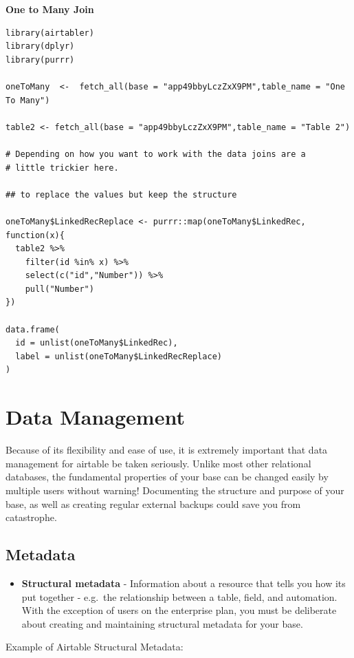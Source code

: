 \documentclass[
]{book}
\providecommand{\tightlist}{%
  \setlength{\itemsep}{0pt}\setlength{\parskip}{0pt}}
\begin{document}
\textbf{One to Many Join}

\begin{verbatim}
library(airtabler)
library(dplyr)
library(purrr)

oneToMany  <-  fetch_all(base = "app49bbyLczZxX9PM",table_name = "One To Many")

table2 <- fetch_all(base = "app49bbyLczZxX9PM",table_name = "Table 2")

# Depending on how you want to work with the data joins are a 
# little trickier here. 

## to replace the values but keep the structure

oneToMany$LinkedRecReplace <- purrr::map(oneToMany$LinkedRec, function(x){
  table2 %>%
    filter(id %in% x) %>%
    select(c("id","Number")) %>% 
    pull("Number")
})

data.frame(
  id = unlist(oneToMany$LinkedRec), 
  label = unlist(oneToMany$LinkedRecReplace)
)
\end{verbatim}

\hypertarget{data-management}{%
\section{Data Management}\label{data-management}}

Because of its flexibility and ease of use, it is extremely important that data
management for airtable be taken seriously. Unlike most other relational databases,
the fundamental properties of your base can be changed easily by multiple users
without warning! Documenting the structure and purpose of your base, as well
as creating regular external backups could save you from catastrophe.

\hypertarget{metadata}{%
\subsection{Metadata}\label{metadata}}

\begin{itemize}
\tightlist
\item
  \textbf{Structural metadata} - Information about a resource that tells you how its
  put together - e.g.~the relationship between a table, field, and automation. With
  the exception of users on the enterprise plan, you must be deliberate about
  creating and maintaining structural metadata for your base.
\end{itemize}

Example of Airtable Structural Metadata:
\end{document}
